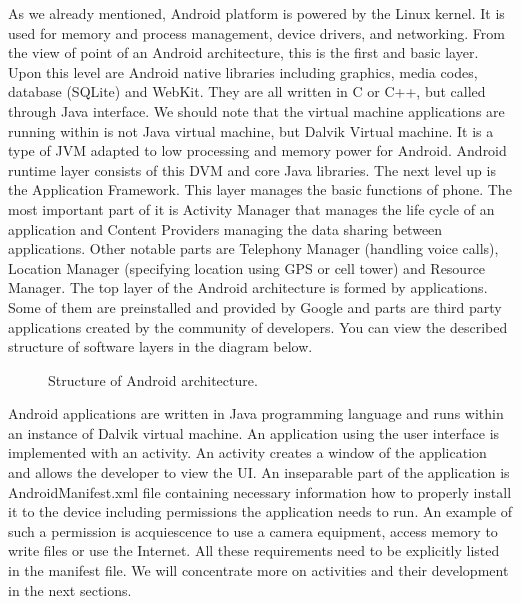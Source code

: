 As we already mentioned, Android platform is powered by the Linux kernel. 
It is used for memory and process management, device drivers, and networking.
From the view of point of an Android architecture, this is the first and basic layer.
Upon this level are Android native libraries including graphics, media codes, database (SQLite) and WebKit.
They are all written in C or C++, but called through Java interface.
We should note that the virtual machine applications are running within is not Java virtual machine, but Dalvik Virtual machine.
It is a type of JVM adapted to low processing and memory power for Android.
Android runtime layer consists of this DVM and core Java libraries.
The next level up is the Application Framework.
This layer manages the basic functions of phone. 
The most important part of it is Activity Manager that manages the life cycle of an application and Content Providers managing the data sharing between applications.
Other notable parts are Telephony Manager (handling voice calls), Location Manager (specifying location using GPS or cell tower) and Resource Manager.
The top layer of the Android architecture is formed by applications.
Some of them are preinstalled and provided by Google and parts are third party applications created by the community of developers.
You can view the described structure of software layers in the diagram below.

\begin{figure}[h!]
    \caption{Structure of Android architecture.}
\end{figure}

Android applications are written in Java programming language and runs within an instance of Dalvik virtual machine.
An application using the user interface is implemented with an activity. 
An activity creates a window of the application and allows the developer to view the UI.
An inseparable part of the application is AndroidManifest\@.xml file containing necessary information how to properly install it to the device 
including permissions the application needs to run. 
An example of such a permission is acquiescence to use a camera equipment, access memory to write files or use the Internet.
All these requirements need to be explicitly listed in the manifest file.
We will concentrate more on activities and their development in the next sections.

